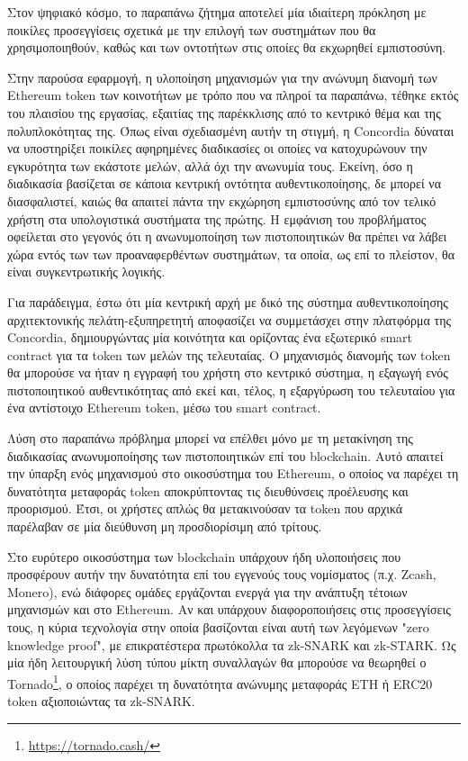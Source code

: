 Στον ψηφιακό κόσμο, το παραπάνω ζήτημα αποτελεί μία ιδιαίτερη πρόκληση με ποικίλες προσεγγίσεις σχετικά με την επιλογή των συστημάτων που θα χρησιμοποιηθούν, καθώς και των οντοτήτων στις οποίες θα εκχωρηθεί εμπιστοσύνη.

Στην παρούσα εφαρμογή, η υλοποίηση μηχανισμών για την ανώνυμη διανομή των Ethereum token των κοινοτήτων με τρόπο που να πληροί τα παραπάνω, τέθηκε εκτός του πλαισίου της εργασίας, εξαιτίας της παρέκκλισης από το κεντρικό θέμα και της πολυπλοκότητας της. Όπως είναι σχεδιασμένη αυτήν τη στιγμή, η Concordia δύναται να υποστηρίξει ποικίλες αφηρημένες διαδικασίες οι οποίες να κατοχυρώνουν την εγκυρότητα των εκάστοτε μελών, αλλά όχι την ανωνυμία τους. Εκείνη, όσο η διαδικασία βασίζεται σε κάποια κεντρική οντότητα αυθεντικοποίησης, δε μπορεί να διασφαλιστεί, καιώς θα απαιτεί πάντα την εκχώρηση εμπιστοσύνης από τον τελικό χρήστη στα υπολογιστικά συστήματα της πρώτης. Η εμφάνιση του προβλήματος οφείλεται στο γεγονός ότι η ανωνυμοποίηση των πιστοποιητικών θα πρέπει να λάβει χώρα εντός των των προαναφερθέντων συστημάτων, τα οποία, ως επί το πλείστον, θα είναι συγκεντρωτικής λογικής.

Για παράδειγμα, έστω ότι μία κεντρική αρχή με δικό της σύστημα αυθεντικοποίησης αρχιτεκτονικής πελάτη-εξυπηρετητή αποφασίζει να συμμετάσχει στην πλατφόρμα της Concordia, δημιουργώντας μία κοινότητα και ορίζοντας ένα εξωτερικό smart contract για τα token των μελών της τελευταίας. Ο μηχανισμός διανομής των token θα μπορούσε να ήταν η εγγραφή του χρήστη στο κεντρικό σύστημα, η εξαγωγή ενός πιστοποιητικού αυθεντικότητας από εκεί και, τέλος, η εξαργύρωση του τελευταίου για ένα αντίστοιχο Ethereum token, μέσω του smart contract.

Λύση στο παραπάνω πρόβλημα μπορεί να επέλθει μόνο με τη μετακίνηση της διαδικασίας ανωνυμοποίησης των πιστοποιητικών επί του blockchain. Αυτό απαιτεί την ύπαρξη ενός μηχανισμού στο οικοσύστημα του Ethereum, ο οποίος να παρέχει τη δυνατότητα μεταφοράς token αποκρύπτοντας τις διευθύνσεις προέλευσης και προορισμού. Έτσι, οι χρήστες απλώς θα μετακινούσαν τα token που αρχικά παρέλαβαν σε μία διεύθυνση μη προσδιορίσιμη από τρίτους.

Στο ευρύτερο οικοσύστημα των blockchain υπάρχουν ήδη υλοποιήσεις που προσφέρουν αυτήν την δυνατότητα επί του εγγενούς τους νομίσματος (π.χ. Zcash, Monero), ενώ διάφορες ομάδες εργάζονται ενεργά για την ανάπτυξη τέτοιων μηχανισμών και στο Ethereum. Αν και υπάρχουν διαφοροποιήσεις στις προσεγγίσεις τους, η κύρια τεχνολογία στην οποία βασίζονται είναι αυτή των λεγόμενων "zero knowledge proof", με επικρατέστερα πρωτόκολλα τα zk-SNARK και zk-STARK. Ως μία ήδη λειτουργική λύση τύπου μίκτη συναλλαγών θα μπορούσε να θεωρηθεί ο Tornado\footnote{\url{https://tornado.cash/}}, ο οποίος παρέχει τη δυνατότητα ανώνυμης μεταφοράς ETH ή ERC20 token αξιοποιώντας τα zk-SNARK.\cite{5.2-privacy-on-ethereum}

